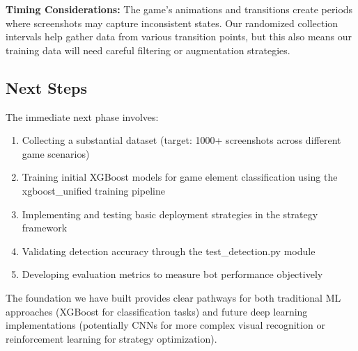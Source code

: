 \documentclass[12pt]{article}
\begin{document}
\textbf{Timing Considerations:} The game's animations and transitions create periods where screenshots may capture inconsistent states. Our randomized collection intervals help gather data from various transition points, but this also means our training data will need careful filtering or augmentation strategies.

\subsection*{Next Steps}
The immediate next phase involves:

\begin{enumerate}
    \item Collecting a substantial dataset (target: 1000+ screenshots across different game scenarios)
    \item Training initial XGBoost models for game element classification using the xgboost\_unified training pipeline
    \item Implementing and testing basic deployment strategies in the strategy framework
    \item Validating detection accuracy through the test\_detection.py module
    \item Developing evaluation metrics to measure bot performance objectively
\end{enumerate}

The foundation we have built provides clear pathways for both traditional ML approaches (XGBoost for classification tasks) and future deep learning implementations (potentially CNNs for more complex visual recognition or reinforcement learning for strategy optimization).

%
%
%
%
\end{document}
